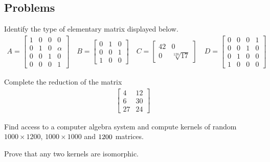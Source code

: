 \documentclass[12pt,twoside,dvipsnames,letterpaper]{memoir}
\begin{document}


\subsection*{Problems}
\begin{prob}
    Identify the type of elementary matrix displayed below.
\begin{gather*}
    A =
    \begin{bmatrix}
         1 & 0 & 0 & 0 \\
         0 & 1 & 0 & \alpha \\
         0 & 0 & 1 & 0 \\
         0 & 0 & 0 & 1 
    \end{bmatrix}
    \quad 
    B=
    \begin{bmatrix} 
        0 & 1 & 0 \\
        0 & 0 & 1 \\
        1 & 0 & 0 
    \end{bmatrix}
    \quad 
    C=
    \begin{bmatrix}
        42 & 0 \\
        0 & \sqrt[128]{17}
    \end{bmatrix}
    \quad 
    D = 
    \begin{bmatrix}
        0 & 0 & 0 & 1 \\ 
        0 & 0 & 1 & 0 \\
        0 & 1 & 0 & 0 \\
        1 & 0 & 0 & 0
    \end{bmatrix}
\end{gather*}
\end{prob}

\begin{prob}
    Complete the reduction of the matrix 
    \begin{align*}
        \begin{bmatrix}
            4 & 12 \\
            6 & 30 \\
            27 & 24
         \end{bmatrix}
    \end{align*}    
\end{prob}

\begin{prob}
    Find access to a computer algebra system 
    and compute kernels of random $1000\times 1200$, 
    $1000 \times 1000$ and $1200\time 1000$ matrices.
\end{prob}

\begin{prob} 
    Prove that any two kernels are isomorphic.
\end{prob}
\end{document}
